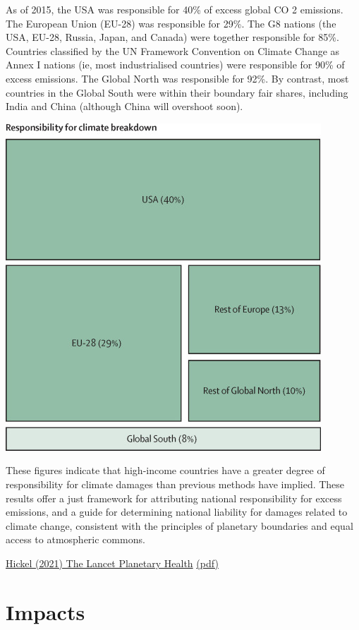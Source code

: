 \documentclass[
]{book}
\begin{document}
As of 2015, the USA was responsible for 40\% of excess global CO 2 emissions. The European Union (EU-28)
was responsible for 29\%. The G8 nations (the USA, EU-28, Russia, Japan, and Canada) were together responsible
for 85\%. Countries classified by the UN Framework Convention on Climate Change as Annex I nations (ie, most
industrialised countries) were responsible for 90\% of excess emissions. The Global North was responsible for 92\%.
By contrast, most countries in the Global South were within their boundary fair shares, including India and China
(although China will overshoot soon).

\includegraphics{fig/Hickel_fair_shares.jpg}

These figures indicate that high-income countries have a greater degree of responsibility for climate
damages than previous methods have implied. These results offer a just framework for attributing national
responsibility for excess emissions, and a guide for determining national liability for damages related to climate
change, consistent with the principles of planetary boundaries and equal access to atmospheric commons.

\href{https://www.thelancet.com/journals/lanplh/article/PIIS2542-5196(20)30196-0/fulltext}{Hickel (2021) The Lancet Planetary Health}
\href{pdf/Hickel_2021_Fair_Shares.pdf}{(pdf)}

\hypertarget{part-impacts}{%
\part{Impacts}\label{part-impacts}}
\end{document}
